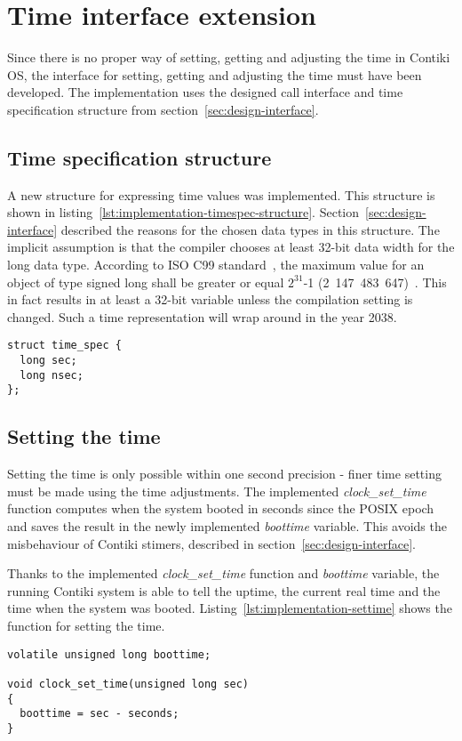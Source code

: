 
\section{Time interface extension}
Since there is no proper way of setting, getting and adjusting the time in Contiki OS,
the interface for setting, getting and adjusting the time must have been developed.
The implementation uses the designed call interface and time specification structure
from section~\ref{sec:design-interface}.

\subsection{Time specification structure}
A new structure for expressing time values was implemented.
This structure is shown in listing~\ref{lst:implementation-timespec-structure}.
Section~\ref{sec:design-interface} described the reasons for the chosen data types
in this structure.
The implicit assumption is that the compiler chooses at least 32-bit data width for the long data type.
According to ISO C99 standard~\cite{c99},
the maximum value for an object of type signed long
shall be greater or equal $2^{31}$-1 (2~147~483~647)~\cite{c99}.
This in fact results in at least a 32-bit variable unless the compilation setting is changed.
Such a time representation will wrap around in the year 2038.
\begin{lstlisting}[caption={Time specification structure},label={lst:implementation-timespec-structure}]
struct time_spec {
  long sec;
  long nsec;
};
\end{lstlisting}


\subsection{Setting the time}
Setting the time is only possible within one second precision -
finer time setting must be made using the time adjustments.
The implemented {\it{clock\_set\_time}} function computes when the system booted
in seconds since the POSIX epoch and saves the result in the newly implemented {\it{boottime}} variable.
This avoids the misbehaviour of Contiki stimers, described in section~\ref{sec:design-interface}.

Thanks to the implemented {\it{clock\_set\_time}} function and {\it{boottime}} variable,
the running Contiki system is able to tell the uptime, the current real time and the time when the system was booted.
Listing~\ref{lst:implementation-settime} shows the function for setting the time.
\begin{lstlisting}[caption={Function for setting the time},label={lst:implementation-settime}]
volatile unsigned long boottime;

void clock_set_time(unsigned long sec)
{
  boottime = sec - seconds;
}
\end{lstlisting}


